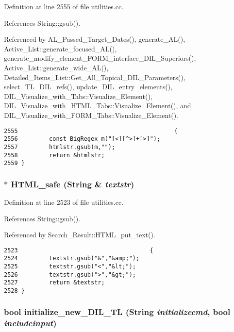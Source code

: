 Definition at line 2555 of file utilities.cc.

References String::gsub().

Referenced by AL\_\-Passed\_\-Target\_\-Dates(), generate\_\-AL(), Active\_\-List::generate\_\-focused\_\-AL(), generate\_\-modify\_\-element\_\-FORM\_\-interface\_\-DIL\_\-Superiors(), Active\_\-List::generate\_\-wide\_\-AL(), Detailed\_\-Items\_\-List::Get\_\-All\_\-Topical\_\-DIL\_\-Parameters(), select\_\-TL\_\-DIL\_\-refs(), update\_\-DIL\_\-entry\_\-elements(), DIL\_\-Visualize\_\-with\_\-Tabs::Visualize\_\-Element(), DIL\_\-Visualize\_\-with\_\-HTML\_\-Tabs::Visualize\_\-Element(), and DIL\_\-Visualize\_\-with\_\-FORM\_\-Tabs::Visualize\_\-Element().



\footnotesize\begin{verbatim}2555                                             {
2556         const BigRegex m("[<][^>]+[>]");
2557         htmlstr.gsub(m,"");
2558         return &htmlstr;
2559 }
\end{verbatim}\normalsize 
{}
\subsubsection{$\ast$ HTML\_\-safe ({\bf String} \& {\em textstr})}\label{dil2al_8hh_a259}




Definition at line 2523 of file utilities.cc.

References String::gsub().

Referenced by Search\_\-Result::HTML\_\-put\_\-text().



\footnotesize\begin{verbatim}2523                                      {
2524         textstr.gsub("&","&amp;");
2525         textstr.gsub("<","&lt;");
2526         textstr.gsub(">","&gt;");
2527         return &textstr;
2528 }
\end{verbatim}\normalsize 
{}
\subsubsection{\setlength{\rightskip}{0pt plus 5cm}bool initialize\_\-new\_\-DIL\_\-TL ({\bf String} {\em initializecmd}, bool {\em includeinput})}\label{dil2al_8hh_a248}




